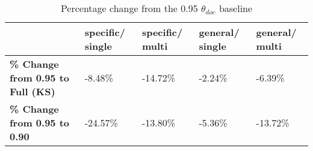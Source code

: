 \begin{table}[h!]
\centering
\caption{Percentage change from the 0.95 $\theta_{doc}$ baseline}
\label{discussion-tab:percent-docOnly-Full}
\begin{tabular}{p{3.5cm} p{2cm} p{2cm} p{2cm} p{2cm}}
\toprule
\textbf{} & \textbf{specific/ single} & \textbf{specific/ multi} & \textbf{general/ single} & \textbf{general/ multi} \\
\midrule
\textbf{\% Change from 0.95 to Full (KS)} & -8.48\% & -14.72\% & -2.24\% & -6.39\% \\
\textbf{\% Change from 0.95 to 0.90} & -24.57\% & -13.80\% & -5.36\% & -13.72\% \\
\bottomrule
\end{tabular} 
\end{table}






